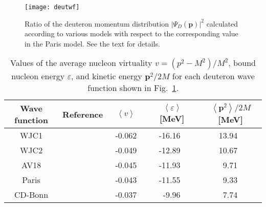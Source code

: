 \documentclass[%
      aps,
      prd,
      floatfix,
      preprintnumbers,
      preprint,
      showpacs,
      nofootinbib,
      tightenlines,
      amssymb,
      amsmath
]{revtex4-1}
\newcommand{\average}[1]{\left\langle{#1}\right\rangle}
\begin{document}
\begin{figure}[htb] %
\begin{center}
\texttt{[image: deutwf]}
\caption{%
Ratio of the deuteron momentum distribution $\left|\Psi_D (\bm p) \right|^2$ calculated according to various models with respect to the corresponding value in 
the Paris model. See the text for details.  
}
\label{fig:deutwf}
\end{center}
\end{figure}


\begin{table}[ht]
\begin{center}
\begin{tabular}{c|c|c|c|c} \hline
Wave function  &  Reference  &  $~~~\average{v}~~~$   &  $~~~\average{\varepsilon}$~[MeV] &  
$~~~\average{\bm{p}^2}/2M$~[MeV]  \\
\hline\hline
WJC1   &  \cite{Gross:2008ps,Gross:2010qm}  & -0.062   & -16.16 & 13.94   \\  
WJC2   &  \cite{Gross:2008ps,Gross:2010qm} &  -0.049  & -12.89 &  10.67  \\ 
AV18    &  \cite{Veerasamy:2011ak}  & -0.045  & -11.93 & ~9.71  \\
Paris   &  \cite{Lacombe:1980dr}  &  -0.043   & -11.55 & ~9.33   \\
CD-Bonn    &  \cite{Machleidt:2000ge} &  -0.037 & ~-9.96 & ~7.74  \\  \hline 
\end{tabular}
\end{center}
\caption{\label{tab:kinwf}
Values of the average nucleon virtuality $v=(p^2-M^2)/M^2$, bound nucleon energy $\varepsilon$, 
and kinetic energy $\bm{p}^2/2M$ for each deuteron wave function shown in Fig.~\ref{fig:deutwf}.  
}
\end{table}
\end{document}
